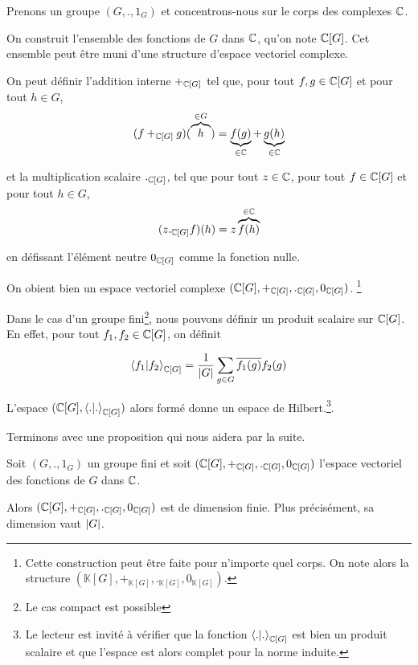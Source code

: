 Prenons un groupe $(G, ., 1_{G})$ et concentrons-nous sur le corps des complexes
$\mathbb{C}$.

On construit l'ensemble des fonctions de $G$ dans $\mathbb{C}$, qu'on note
$\mathbb{C}[G]$. Cet ensemble peut être muni d'une structure d'espace vectoriel
complexe.

On peut définir l'addition interne $+_{\mathbb{C}[G]}$ tel que, pour tout $f, g
\in \mathbb{C}[G]$ et pour tout $h \in G$,
\begin{equation}
	(f +_{\mathbb{C}[G]} g) (\overbrace{h}^{\in G}) = \underbrace{f(g)}_{\in
	\mathbb{C}} + \underbrace{g(h)}_{\in \mathbb{C}}
\end{equation}

et la multiplication scalaire $._{\mathbb{C}[G]}$, tel que pour tout $z \in \mathbb{C}$,
pour tout $f \in \mathbb{C}[G]$ et pour tout $h \in G$,
\begin{equation}
	(z ._{\mathbb{C}[G]} f) (h) = z \overbrace{f(h)}^{\in \mathbb{C}}
\end{equation}

en défissant l'élément neutre $0_{\mathbb{C}[G]}$ comme la fonction nulle.

On obient bien un espace vectoriel complexe $(\mathbb{C}[G], +_{\mathbb{C}[G]},
	._{\mathbb{C}[G]}, 0_{\mathbb{C}[G]})$. \footnote{Cette construction peut être
		faite pour n'importe quel corps. On note alors la structure
		$(\mathbb{K}[G], +_{\mathbb{K}[G]}, ._{\mathbb{K}[G]},
		0_{\mathbb{K}[G]})$.}

		Dans le cas d'un groupe fini\footnote{Le cas compact est possible}, nous pouvons définir un produit scalaire sur
$\mathbb{C}[G]$. En effet, pour tout $f_{1}, f_{2} \in \mathbb{C}[G]$, on définit

\begin{equation}
	\bra{f_{1}}\ket{f_{2}}_{\mathbb{C}[G]} = \frac{1}{|G|} \sum_{g \in G}
	\overline{f_{1}(g)} f_{2}(g)
\end{equation}

L'espace $(\mathbb{C}[G], \bra{.}\ket{.}_{\mathbb{C}[G]})$ alors formé donne un
espace de Hilbert.\footnote{Le lecteur est invité à vérifier que la fonction
	$\bra{.}\ket{.}_{\mathbb{C}[G]}$ est bien un produit scalaire et que l'espace
est alors complet pour la norme induite.}.

Terminons avec une proposition qui nous aidera par la suite.

\begin{proposition}
	Soit $(G, ., 1_{G})$ un groupe fini et soit $(\mathbb{C}[G], +_{\mathbb{C}[G]},
	._{\mathbb{C}[G]}, 0_{\mathbb{C}[G]})$ l'espace vectoriel des fonctions de $G$
	dans $\mathbb{C}$.

	Alors $(\mathbb{C}[G], +_{\mathbb{C}[G]}, ._{\mathbb{C}[G]}, 0_{\mathbb{C}[G]})$ est
	de dimension finie. Plus précisément, sa dimension vaut $|G|$.
\end{proposition}

